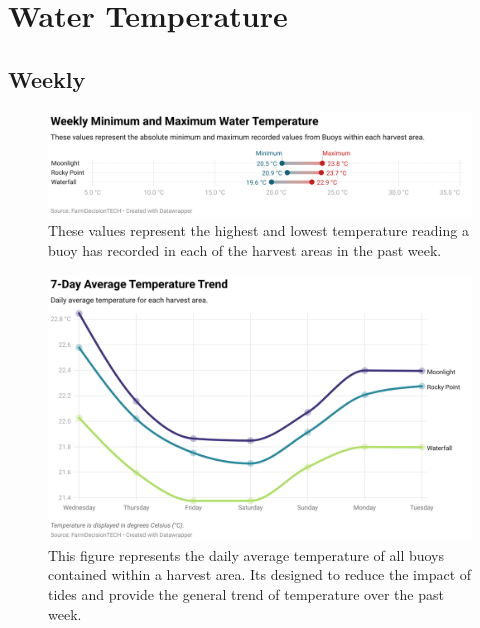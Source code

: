 \documentclass[10pt]{article}
\begin{document}
\pagebreak

\newpage
\section{Water Temperature}
\subsection{Weekly}

\begin{figure}[H]
\centering
\includegraphics[width=\textwidth]{weekly-temperature-extremes.png}
\caption[Weekly Minimum and Maximum Temperature]{These values represent the highest and lowest temperature reading a buoy has recorded in each of the harvest areas in the past week.}
\end{figure}

\begin{figure}[H]
\centering
\includegraphics[width=\textwidth]{weekly-temperature-chart.png}
\caption[Average Weekly Temperature Chart]{This figure represents the daily average temperature of all buoys contained within a harvest area. Its designed to reduce the impact of tides and provide the general trend of temperature over the past week.}
\end{figure}
\end{document}
